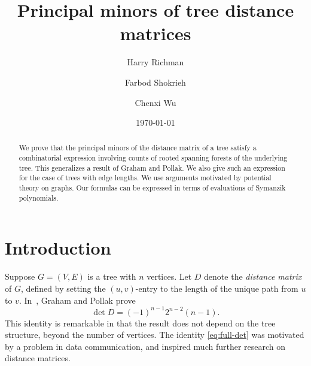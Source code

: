 \documentclass[12pt]{amsart}
\theoremstyle{definition}
\begin{document}
\title{Principal minors of tree distance matrices}
\author{Harry Richman}
\author{Farbod Shokrieh}
\author{Chenxi Wu}
\date{\today}



\begin{abstract}
We prove that the principal minors of the distance matrix of a tree satisfy a combinatorial expression 
involving counts of rooted spanning forests of the underlying tree.
This generalizes a result of Graham and Pollak.
We also give such an expression for the case of trees with edge lengths.
We use arguments motivated by potential theory on graphs.
Our formulas can be expressed in terms of evaluations of Symanzik polynomials.
\end{abstract}
\maketitle

\setcounter{tocdepth}{1}
\tableofcontents

\section{Introduction}
\renewcommand*{\thethm}{\Alph{thm}}

Suppose $G = (V,E)$ is a tree with $n$ vertices.
Let $D$ denote the {\em distance matrix} of $G$, defined by setting the $(u,v)$-entry to the length of the unique path from $u$ to $v$.
In~\cite{graham-pollak}, Graham and Pollak prove
\begin{equation}\label{eq:full-det}
	\det D = (-1)^{n-1} 2^{n-2} (n-1). 
\end{equation}
This identity is remarkable in that the result does not depend on the tree structure,
beyond the number of vertices.
The identity \eqref{eq:full-det} was motivated by a problem in data communication,
and inspired much further research on distance matrices.
\end{document}
